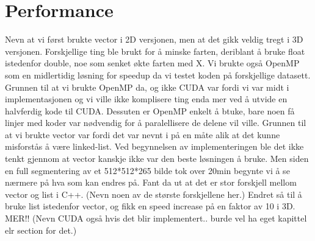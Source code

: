 \section{Performance}
Nevn at vi først brukte vector i 2D versjonen, men at det gikk veldig tregt i 3D versjonen. Forskjellige ting ble brukt for å minske farten, deriblant å bruke float istedenfor double, noe som senket økte farten med X. Vi brukte også OpenMP som en midlertidig løsning for speedup da vi testet koden på forskjellige datasett. Grunnen til at vi brukte OpenMP da, og ikke CUDA var fordi vi var midt i implementasjonen og vi ville ikke komplisere ting enda mer ved å utvide en halvferdig kode til CUDA. Dessuten er OpenMP enkelt å btuke, bare noen få linjer med koder var nødvendig for å paralellisere de delene vil ville. Grunnen til at vi brukte vector var fordi det var nevnt i \cite{lankton09} på en måte alik at det kunne misforstås å være linked-list. Ved begynnelsen av implementeringen ble det ikke tenkt gjennom at vector kanskje ikke var den beste løsningen å bruke. Men siden en full segmentering av et 512*512*265 bilde tok over 20min begynte vi å se nærmere på hva som kan endres på. Fant da ut at det er stor forskjell mellom vector og list i C++. (Nevn noen av de største forskjellene her.) Endret så til å bruke list istedenfor vector, og fikk en speed increase på en faktor av 10 i 3D. MER!! (Nevn CUDA også hvis det blir implementert.. burde vel ha eget kapittel elr section for det.) 



